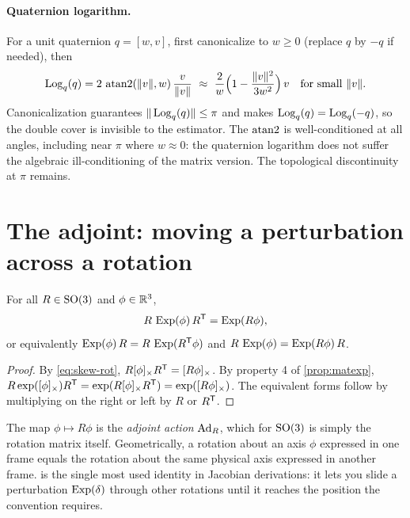 \paragraph{Quaternion logarithm.} For a unit quaternion $q = [w, v]$, first canonicalize to $w \ge 0$ (replace
$q$ by $-q$ if needed), then
\begin{equation}
  \operatorname{Log}_q(q) = 2\,\operatorname{atan2}(\|v\|, w)\,\frac{v}{\|v\|}
  \ \approx\ \frac{2}{w}\Big(1 - \frac{\|v\|^2}{3w^2}\Big)\,v \quad\text{for small }\|v\|.
  \label{eq:Logq}
\end{equation}
Canonicalization guarantees $\|\operatorname{Log}_q(q)\| \le \pi$ and makes $\operatorname{Log}_q(q) = \operatorname{Log}_q(-q)$, so the double cover is
invisible to the estimator. The $\operatorname{atan2}$ is well-conditioned at all angles, including near $\pi$ where
$w \approx 0$: the quaternion logarithm does not suffer the algebraic ill-conditioning of the matrix version.
The topological discontinuity at $\pi$ remains.

\section{The adjoint: moving a perturbation across a rotation}

\begin{proposition}[Adjoint of $\SO$]
\label{prop:adjoint}
For all $R \in \mathrm{SO}(3)$ and $\phi \in \mathbb{R}^3$,
\begin{equation}
  R\,\operatorname{Exp}(\phi)\,R^{\mathsf{T}} = \operatorname{Exp}(R\phi),
  \label{eq:adjoint}
\end{equation}
or equivalently $\operatorname{Exp}(\phi)\,R = R\,\operatorname{Exp}(R^{\mathsf{T}}\phi)$ and $R\,\operatorname{Exp}(\phi) = \operatorname{Exp}(R\phi)\,R$.
\end{proposition}
\begin{proof}
By \eqref{eq:skew-rot}, $R[\phi]_{\times}R^{\mathsf{T}} = [R\phi]_{\times}$. By property 4 of \cref{prop:matexp},
$R\exp([\phi]_{\times})R^{\mathsf{T}} = \exp(R[\phi]_{\times}R^{\mathsf{T}}) = \exp([R\phi]_{\times})$. The equivalent forms follow by
multiplying on the right or left by $R$ or $R^{\mathsf{T}}$.
\end{proof}

The map $\phi \mapsto R\phi$ is the \emph{adjoint action} $\operatorname{Ad}_R$, which for $\SO$ is simply the rotation
matrix itself. Geometrically, a rotation about an axis $\phi$ expressed in one frame equals the rotation
about the same physical axis expressed in another frame.  is the single most used identity
in Jacobian derivations: it lets you slide a perturbation $\operatorname{Exp}(\delta)$ through other rotations until
it reaches the position the convention requires.

